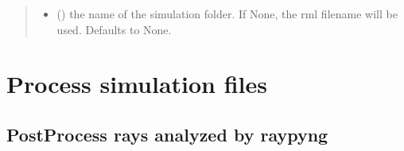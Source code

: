 \documentclass[letterpaper,10pt,english]{sphinxmanual}
\begin{document}
\begin{fulllineitems}
\begin{quote}
\begin{description}
\begin{itemize}
\item {} 
\sphinxAtStartPar
{} (\sphinxstyleliteralemphasis{\sphinxupquote{, }}) \textendash{} the name of the simulation folder. If None, the rml
filename will be used. Defaults to None.

\end{itemize}

\end{description}\end{quote}

\end{fulllineitems}



\section{Process simulation files}
\label{\detokenize{code_documentation:process-simulation-files}}

\subsection{PostProcess rays analyzed by raypyng}
\label{\detokenize{code_documentation:postprocess-rays-analyzed-by-raypyng}}
\end{document}
